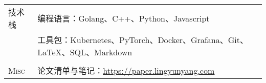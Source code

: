 \documentclass[letterpaper, 10pt]{article}
\begin{document}
\begin{longtable}{p{0.7in}p{6.0in}}




\nohyphens{技术栈}
& 编程语言：Golang、C++、Python、Javascript \\
& 工具包：Kubernetes、PyTorch、Docker、Grafana、Git、\LaTeX、SQL、Markdown \\
& \\


\nohyphens{\textsc{Misc}}
& 论文清单与笔记：\href{https://paper.lingyunyang.com}{\underline{https://paper.lingyunyang.com}} \\



\end{longtable}
\end{document}

